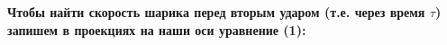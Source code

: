\documentclass[a4paper,14pt]{article}
\begin{document}
    
    \begin{multicols}{2}
        
        \noindent\textbf{Чтобы найти скорость шарика перед вторым ударом (т.е. через время $\tau$) запишем в проекциях на наши оси уравнение (1):}
        
        \columnbreak
        
        \noindent\textbf{}
        
    \end{multicols}
    
\end{document}
